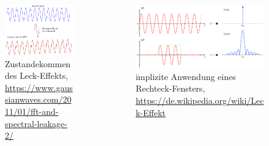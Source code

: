 \begin{frame}{\insertsection}
	\begin{columns}[T] %
		\begin{column}{0.48\textwidth}
			\begin{figure}
				\includegraphics[scale=0.25]{images/spectralLeakage.png}
				\caption*{\centering Zustandekommen des Leck-Effekts, \href{https://www.gaussianwaves.com/2011/01/fft-and-spectral-leakage-2/}{\tiny https://www.gaussianwaves.com/2011/01/fft-and-spectral-leakage-2/}}
			\end{figure}
		\end{column}
		\hfill
		\begin{column}{0.5\textwidth}
			\begin{figure}
				\includegraphics[scale=0.185]{images/spectralLeakage-WindowFunction.png}
				\caption*{\centering implizite Anwendung eines Rechteck-Fensters, \href{https://de.wikipedia.org/wiki/Leck-Effekt}{\tiny https://de.wikipedia.org/wiki/Leck-Effekt}}
			\end{figure}
		\end{column}
	\end{columns}
\end{frame}

